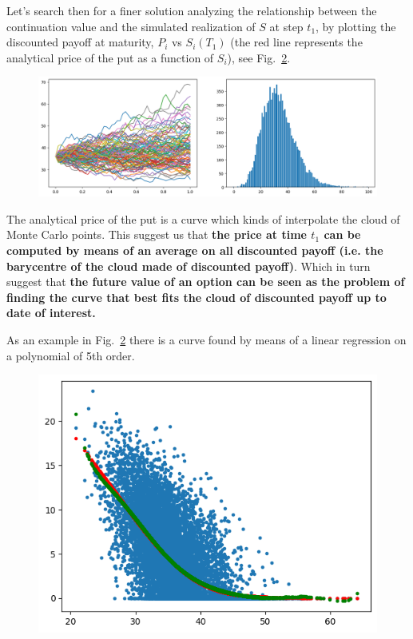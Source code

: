 \documentclass[12pt,a4paper]{article}
\begin{document}
Let's search then for a finer solution analyzing the relationship between the continuation value and the simulated realization of $S$ at step $t_1$, by plotting the discounted payoff at maturity, $P_i$ vs $S_i(T_1)$ (the red line represents the analytical price of the put as a function of $S_i$), see Fig.~\ref{fig:continuation_function}.

\begin{figure}[htbp]
	\begin{center}
		\includegraphics[width=0.8\linewidth]{addons/lsm_paths}
	\end{center}
	\label{fig:lsm_paths}
\end{figure}

The analytical price of the put is a curve which kinds of interpolate the cloud of Monte Carlo points. This suggest us that
\textbf{the price at time $t_1$ can be computed by means of an average on all discounted payoff (i.e. the barycentre of the cloud made of discounted payoff)}.
Which in turn suggest that \textbf{the future value of an option can be seen as the problem of finding the curve that best fits the cloud of discounted payoff up to date of interest.}

As an example in Fig.~\ref{fig:continuation_function} there is a curve found by means of a linear regression on a polynomial of 5th order.

\begin{figure}[htbp]
	\begin{center}
		\includegraphics[width=0.5\linewidth]{addons/continuation_function}
	\end{center}
	\label{fig:continuation_function}
\end{figure}
\end{document}
